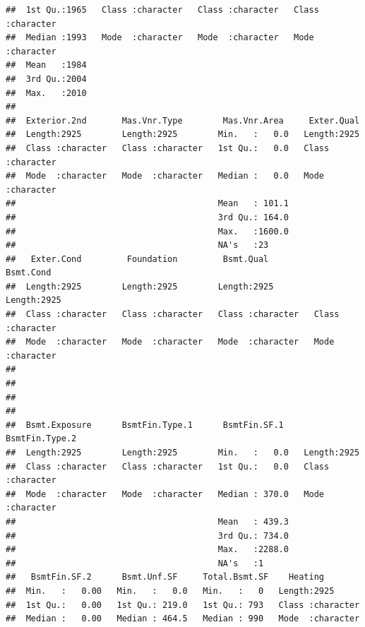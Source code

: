 \documentclass[
]{article}
\begin{document}
\begin{verbatim}
##  1st Qu.:1965   Class :character   Class :character   Class :character  
##  Median :1993   Mode  :character   Mode  :character   Mode  :character  
##  Mean   :1984                                                           
##  3rd Qu.:2004                                                           
##  Max.   :2010                                                           
##                                                                         
##  Exterior.2nd       Mas.Vnr.Type        Mas.Vnr.Area     Exter.Qual       
##  Length:2925        Length:2925        Min.   :   0.0   Length:2925       
##  Class :character   Class :character   1st Qu.:   0.0   Class :character  
##  Mode  :character   Mode  :character   Median :   0.0   Mode  :character  
##                                        Mean   : 101.1                     
##                                        3rd Qu.: 164.0                     
##                                        Max.   :1600.0                     
##                                        NA's   :23                         
##   Exter.Cond         Foundation         Bsmt.Qual          Bsmt.Cond        
##  Length:2925        Length:2925        Length:2925        Length:2925       
##  Class :character   Class :character   Class :character   Class :character  
##  Mode  :character   Mode  :character   Mode  :character   Mode  :character  
##                                                                             
##                                                                             
##                                                                             
##                                                                             
##  Bsmt.Exposure      BsmtFin.Type.1      BsmtFin.SF.1    BsmtFin.Type.2    
##  Length:2925        Length:2925        Min.   :   0.0   Length:2925       
##  Class :character   Class :character   1st Qu.:   0.0   Class :character  
##  Mode  :character   Mode  :character   Median : 370.0   Mode  :character  
##                                        Mean   : 439.3                     
##                                        3rd Qu.: 734.0                     
##                                        Max.   :2288.0                     
##                                        NA's   :1                          
##   BsmtFin.SF.2      Bsmt.Unf.SF     Total.Bsmt.SF    Heating         
##  Min.   :   0.00   Min.   :   0.0   Min.   :   0   Length:2925       
##  1st Qu.:   0.00   1st Qu.: 219.0   1st Qu.: 793   Class :character  
##  Median :   0.00   Median : 464.5   Median : 990   Mode  :character  

\end{verbatim}
\end{document}
